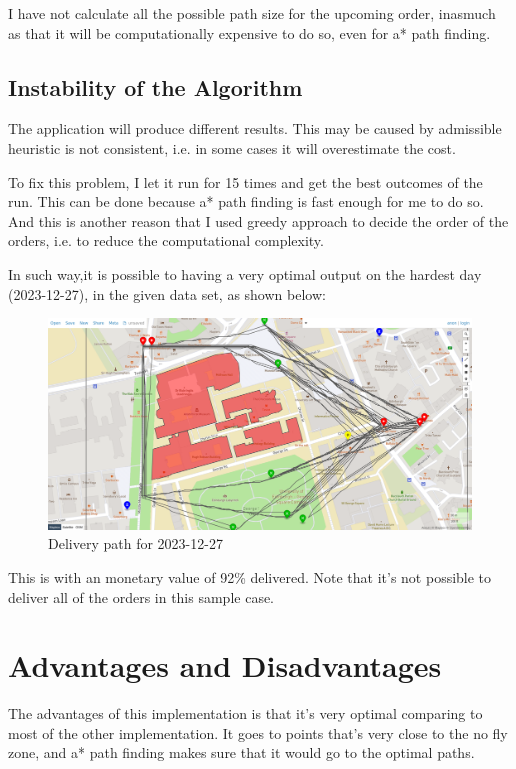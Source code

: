\documentclass[a4paper,article,fontsize=15pt]{scrartcl}
\numberwithin{equation}{section}		%
\numberwithin{figure}{section}			%
\numberwithin{table}{section}				%
\begin{document}
I have not calculate all the possible path size for the upcoming order, inasmuch as that it will be computationally expensive to do so, even for a* path finding. 
\subsection{Instability of the Algorithm}
The application will produce different results. This may be caused by admissible heuristic is not consistent, i.e. in some cases it will overestimate the cost.

To fix this problem, I let it run for 15 times and get the best outcomes of the run. This can be done because a* path finding is fast enough for me to do so. And this is another reason that I used greedy approach to decide the order of the orders, i.e. to reduce the computational complexity.

In such way,it is possible to having a very optimal output on the hardest day (2023-12-27), in the given data set, as shown below:

    \begin{figure}[H]
        \centering
    	    \includegraphics[width=1\textwidth]{bestrun.png}
    	\caption{Delivery path for 2023-12-27}
        \label{best run}
    \end{figure}
\newpage

This is with an monetary value of 92\% delivered. Note that it's not possible to deliver all of the orders in this sample case.
\section{Advantages and Disadvantages}
The advantages of this implementation is that it's very optimal comparing to most of the other implementation. It goes to points that's very close to the no fly zone, and a* path finding makes sure that it would go to the optimal paths.\hfill \\
\end{document}
